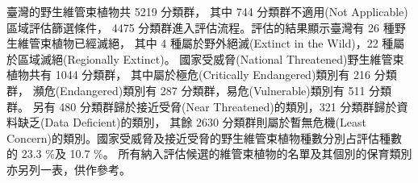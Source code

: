 臺灣的野生維管束植物共 5219 分類群，
其中 744 分類群不適用(Not Applicable)區域評估篩選條件，
4475 分類群進入評估流程。評估的結果顯示臺灣有 26 種野生維管束植物已經滅絕，
其中 4 種屬於野外絕滅(Extinct in the Wild)，22 種屬於區域滅絕(Regionally Extinct)。
國家受威脅(National Threatened)野生維管束植物共有 1044 分類群，
其中屬於極危(Critically Endangered)類別有 216 分類群，
瀕危(Endangered)類別有 287 分類群，易危(Vulnerable)類別有 511 分類群。
另有 480 分類群歸於接近受脅(Near Threatened)的類別，321 分類群歸於資料缺乏(Data Deficient)的類別，
其餘 2630 分類群則屬於暫無危機(Least Concern)的類別。國家受威脅及接近受脅的野生維管束植物種數分別占評估種數的 23.3 \%及 10.7 \%。
所有納入評估候選的維管束植物的名單及其個別的保育類別亦另列一表，供作參考。
